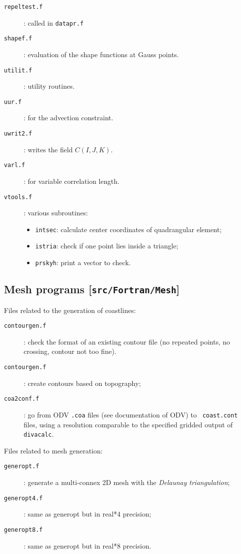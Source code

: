 \begin{description}
\item[\texttt{repeltest.f}]: called in \texttt{datapr.f}
\item[\texttt{shapef.f}]: evaluation of the shape functions at Gauss points.
\item[\texttt{utilit.f}]: utility routines.
\item[\texttt{uur.f}]: for the advection constraint.
\item[\texttt{uwrit2.f}]: writes the field $C(I,J,K)$.  
\item[\texttt{varl.f}]: for variable correlation length.
\item[\texttt{vtools.f}]: various subroutines: 
\begin{itemize}
\item[]  \texttt{intsec}: calculate center coordinates of quadrangular element;
\item[]  \texttt{istria}: check if one point lies inside a triangle;
\item[]  \texttt{prskyh}: print a vector to check.
\end{itemize}

\end{description}


\subsection[Mesh programs]{Mesh programs [\texttt{src/Fortran/Mesh}]}

Files related to the generation of coastlines:
\begin{description}
\item[\texttt{contourgen.f}]: check the format of an existing contour file (no repeated points, no crossing, contour not too fine).
\item[\texttt{contourgen.f}]: create contours based on topography;
\item[\texttt{coa2conf.f}]: go from ODV \texttt{.coa} files (see documentation of ODV) to \diva\, \texttt{coast.cont} files, using a resolution comparable to the specified gridded output of \texttt{divacalc}.
\end{description}

Files related to mesh generation:
\begin{description}
\item[\texttt{generopt.f}]: generate a multi-connex 2D mesh with the \textit{Delaunay tri\-angu\-la\-tion};
\item[\texttt{generopt4.f}]: same as generopt but in real*4 precision;
\item[\texttt{generopt8.f}]: same as generopt but in real*8 precision.
\end{description}


